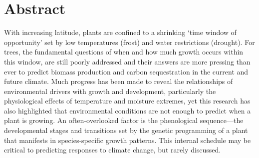 \documentclass{article}
\begin{document}
	
\section*{Abstract} %
		With increasing latitude, plants are confined to a shrinking ‘time window of opportunity’ set by low temperatures (frost) and water restrictions (drought). For trees, the fundamental questions of when and how much growth occurs within this window, are still poorly addressed and their answers are more pressing than ever to predict biomass production and carbon sequestration in the current and future climate. Much progress has been made to reveal the relationships of environmental drivers with growth and development, particularly the physiological effects of temperature and moisture extremes, yet this research has also highlighted that environmental conditions are not enough to predict when a plant is growing. An often-overlooked factor is the phenological sequence---the developmental stages and transitions set by the genetic programming of a plant that manifests in species-specific growth patterns. This internal schedule may be critical to predicting responses to climate change, but rarely discussed. 
\end{document}
